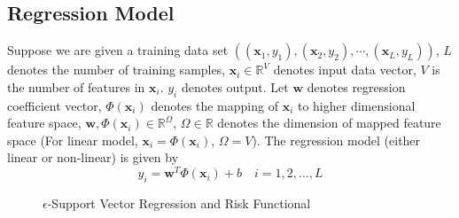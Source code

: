 \documentclass[12pt, draftclsnofoot, onecolumn]{IEEEtran}
\begin{document}
\begin{spacing}{2}
\subsection{Regression Model}
Suppose we are given a training data set $((\mathbf{x}_{1}, y_{1}),(\mathbf{x}_{2},y_{2}),\cdots,(\mathbf{x}_{L},y_{L}))$, $L$ denotes the number of training samples, $\mathbf{x}_{i}\in \mathbb{R}^{V}$ denotes input data vector, $V$ is the number of features in $\mathbf{x}_{i}$. $y_{i}$ denotes output. Let $\mathbf{w}$ denotes regression coefficient vector, $\Phi(\mathbf{x}_{i})$ denotes the mapping of $\mathbf{x}_{i}$ to higher dimensional feature space, $\mathbf{w},\Phi(\mathbf{x}_{i})\in \mathbb{R}^{\Omega}$, $\Omega \in \mathbb{R}$ denotes the dimension of mapped feature space (For linear model, $\mathbf{x}_{i}=\Phi(\mathbf{x}_{i})$, $\Omega=V$). The regression model (either linear or non-linear) is given by 
\begin{equation}
y_{i}=\mathbf{w}^{T}\Phi(\mathbf{x}_{i})+b  \quad i= 1,2,\ldots, L
\label{equation1}
\end{equation} 

\begin{figure}
\centering
\def\svgwidth{\columnwidth}

\caption{$\epsilon$-Support Vector Regression and Risk Functional}
\label{epsilon-SVR}
\end{figure}


\end{spacing}
\end{document}
